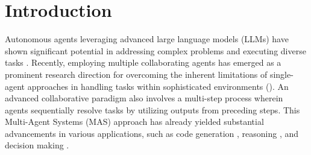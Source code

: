 
\section{Introduction}\label{sec:intro}


Autonomous agents leveraging advanced large language models (LLMs) have shown significant potential in addressing complex problems and executing diverse tasks \cite{shinn2023reflexion}. 
Recently, employing multiple collaborating agents has emerged as a prominent research direction for overcoming the inherent limitations of single-agent approaches in handling tasks within sophisticated environments (\cite{li2023camel, multi-persona}).
An advanced collaborative paradigm also involves a multi-step process wherein agents sequentially resolve tasks by utilizing outputs from preceding steps.
This Multi-Agent Systems (MAS) approach has already yielded substantial advancements in various applications, such as code generation \cite{shinn2023reflexion}, reasoning \cite{debate1-mit}, and decision making \cite{sun2024llm}.








